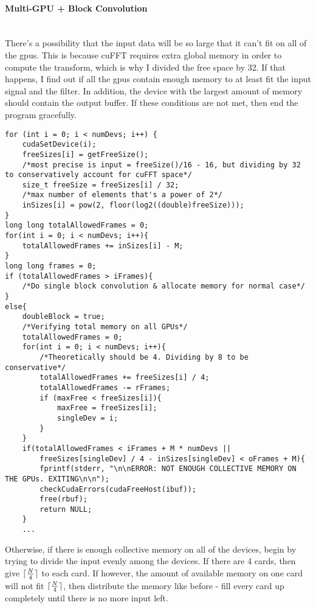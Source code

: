 \paragraph{Multi-GPU + Block Convolution} \hspace{0pt} \\
\indent There's a possibility that the input data will be so large that it can't fit on all of the \glspl{gpu}. This is because cuFFT requires extra global memory in order to compute the transform, which is why I divided the free space by 32. If that happens, I find out if all the \glspl{gpu} contain enough memory to at least fit the input signal and the filter. In addition, the device with the largest amount of memory should contain the output buffer. If these conditions are not met, then end the program gracefully.

\begin{verbatim}
for (int i = 0; i < numDevs; i++) {
	cudaSetDevice(i);
	freeSizes[i] = getFreeSize();
	/*most precise is input = freeSize()/16 - 16, but dividing by 32 to conservatively account for cuFFT space*/
	size_t freeSize = freeSizes[i] / 32;
	/*max number of elements that's a power of 2*/
	inSizes[i] = pow(2, floor(log2((double)freeSize)));
}
long long totalAllowedFrames = 0;
for(int i = 0; i < numDevs; i++){
	totalAllowedFrames += inSizes[i] - M;
}
long long frames = 0;
if (totalAllowedFrames > iFrames){
	/*Do single block convolution & allocate memory for normal case*/
}
else{
    doubleBlock = true;
    /*Verifying total memory on all GPUs*/
	totalAllowedFrames = 0;
	for(int i = 0; i < numDevs; i++){
		/*Theoretically should be 4. Dividing by 8 to be conservative*/
		totalAllowedFrames += freeSizes[i] / 4;
		totalAllowedFrames -= rFrames;
		if (maxFree < freeSizes[i]){
			maxFree = freeSizes[i];
			singleDev = i;
		}
	}
	if(totalAllowedFrames < iFrames + M * numDevs || 
		freeSizes[singleDev] / 4 - inSizes[singleDev] < oFrames + M){
		fprintf(stderr, "\n\nERROR: NOT ENOUGH COLLECTIVE MEMORY ON THE GPUs. EXITING\n\n");
		checkCudaErrors(cudaFreeHost(ibuf));
		free(rbuf);
		return NULL;
	}
	...
\end{verbatim}

Otherwise, if there is enough collective memory on all of the devices, begin by trying to divide the input evenly among the devices. If there are 4 cards, then give $\lceil\frac{N}{4}\rceil$ to each card. If however, the amount of available memory on one card will not fit $\lceil\frac{N}{4}\rceil$, then distribute the memory like before - fill every card up completely until there is no more input left.


